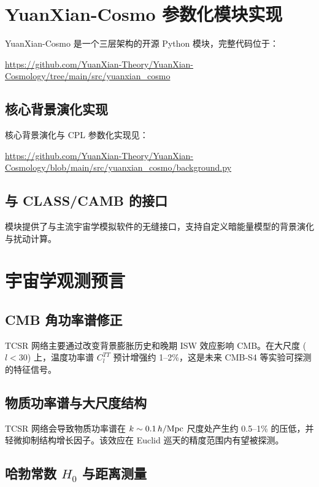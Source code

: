 \documentclass[12pt,a4paper]{ctexart}
\begin{document}
\section{YuanXian-Cosmo 参数化模块实现}

YuanXian-Cosmo 是一个三层架构的开源 Python 模块，完整代码位于：

\url{https://github.com/YuanXian-Theory/YuanXian-Cosmology/tree/main/src/yuanxian_cosmo}

\subsection{核心背景演化实现}

核心背景演化与 CPL 参数化实现见：

\url{https://github.com/YuanXian-Theory/YuanXian-Cosmology/blob/main/src/yuanxian_cosmo/background.py}

\subsection{与 CLASS/CAMB 的接口}

模块提供了与主流宇宙学模拟软件的无缝接口，支持自定义暗能量模型的背景演化与扰动计算。

\section{宇宙学观测预言}

\subsection{CMB 角功率谱修正}

TCSR 网络主要通过改变背景膨胀历史和晚期 ISW 效应影响 CMB。在大尺度 ($l < 30$) 上，温度功率谱 $C_l^{TT}$ 预计增强约 1–2\%，这是未来 CMB-S4 等实验可探测的特征信号。

\subsection{物质功率谱与大尺度结构}

TCSR 网络会导致物质功率谱在 $k \sim 0.1\, h/{\rm Mpc}$ 尺度处产生约 0.5–1\% 的压低，并轻微抑制结构增长因子。该效应在 Euclid 巡天的精度范围内有望被探测。

\subsection{哈勃常数 $H_0$ 与距离测量}
\end{document}
